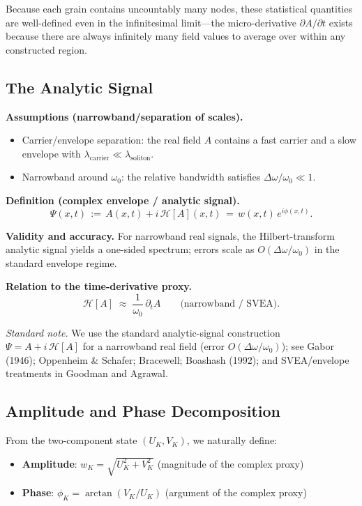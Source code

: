\documentclass[11pt]{article}
\begin{document}
Because each grain contains uncountably many nodes, these statistical quantities are well-defined even in the infinitesimal limit—the micro-derivative $\partial A/\partial t$ exists because there are always infinitely many field values to average over within any constructed region.

\subsection{The Analytic Signal}

\textbf{Assumptions (narrowband/separation of scales).}
\begin{itemize}[leftmargin=*]
  \item Carrier/envelope separation: the real field $A$ contains a fast carrier and a slow envelope with $\lambda_{\text{carrier}}\ll \lambda_{\text{soliton}}$.
  \item Narrowband around $\omega_0$: the relative bandwidth satisfies $\Delta\omega/\omega_0\ll 1$.
\end{itemize}

\textbf{Definition (complex envelope / analytic signal).}
\begin{equation}
  \Psi(x,t) \,:=\, A(x,t) + i\,\mathcal H[A](x,t) \,=\, w(x,t)\,e^{i\phi(x,t)}.
\end{equation}

\textbf{Validity and accuracy.} For narrowband real signals, the Hilbert-transform analytic signal yields a one-sided spectrum; errors scale as $O(\Delta\omega/\omega_0)$ in the standard envelope regime.

\textbf{Relation to the time-derivative proxy.}
\begin{equation}
  \mathcal H[A] \;\approx\; \frac{1}{\omega_0}\,\partial_t A \qquad \text{(narrowband / SVEA)}.
\end{equation}

\noindent \textit{Standard note.} We use the standard analytic-signal construction $\Psi = A + i\,\mathcal H[A]$ for a narrowband real field (error $O(\Delta\omega/\omega_0)$); see Gabor (1946); Oppenheim \& Schafer; Bracewell; Boashash (1992); and SVEA/envelope treatments in Goodman and Agrawal.

\subsection{Amplitude and Phase Decomposition}

From the two-component state $(U_K, V_K)$, we naturally define:
\begin{itemize}
\item \textbf{Amplitude}: $w_K = \sqrt{U_K^2 + V_K^2}$ (magnitude of the complex proxy)
\item \textbf{Phase}: $\phi_K = \arctan(V_K/U_K)$ (argument of the complex proxy)
\end{itemize}
\end{document}
